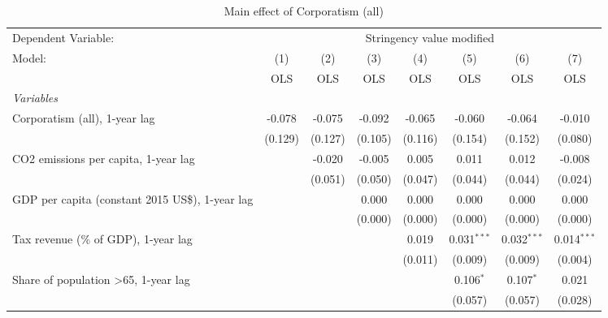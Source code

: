
\begin{table}[htbp]
   \caption{Main effect of Corporatism (all)}
   \centering
   \begin{tabular}{lccccccc}
      \toprule
      Dependent Variable: & \multicolumn{7}{c}{Stringency value modified}\\
      Model:                                                & (1)     & (2)     & (3)     & (4)     & (5)           & (6)           & (7)\\  
                                                            &  OLS    & OLS     & OLS     & OLS     & OLS           & OLS           & OLS\\  
      \midrule
      \emph{Variables}\\
      Corporatism (all), 1-year lag                         & -0.078  & -0.075  & -0.092  & -0.065  & -0.060        & -0.064        & -0.010\\   
                                                            & (0.129) & (0.127) & (0.105) & (0.116) & (0.154)       & (0.152)       & (0.080)\\   
      CO2 emissions per capita, 1-year lag                  &         & -0.020  & -0.005  & 0.005   & 0.011         & 0.012         & -0.008\\   
                                                            &         & (0.051) & (0.050) & (0.047) & (0.044)       & (0.044)       & (0.024)\\   
      GDP per capita (constant 2015 US\$), 1-year lag       &         &         & 0.000   & 0.000   & 0.000         & 0.000         & 0.000\\   
                                                            &         &         & (0.000) & (0.000) & (0.000)       & (0.000)       & (0.000)\\   
      Tax revenue (\% of GDP), 1-year lag                   &         &         &         & 0.019   & 0.031$^{***}$ & 0.032$^{***}$ & 0.014$^{***}$\\   
                                                            &         &         &         & (0.011) & (0.009)       & (0.009)       & (0.004)\\   
      Share of population >65, 1-year lag                   &         &         &         &         & 0.106$^{*}$   & 0.107$^{*}$   & 0.021\\   
                                                            &         &         &         &         & (0.057)       & (0.057)       & (0.028)\\   

\end{tabular}
\end{table}
